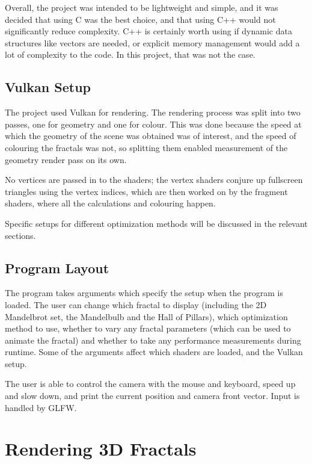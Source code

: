 Overall, the project was intended to be lightweight and simple, and it was decided that using C was the best choice, and that using C++ would not significantly reduce complexity. C++ is certainly worth using if dynamic data structures like vectors are needed, or explicit memory management would add a lot of complexity to the code. In this project, that was not the case.

\subsection{Vulkan Setup}

The project used Vulkan for rendering. The rendering process was split into two passes, one for geometry and one for colour. This was done because the speed at which the geometry of the scene was obtained was of interest, and the speed of colouring the fractals was not, so splitting them enabled measurement of the geometry render pass on its own.\newline

No vertices are passed in to the shaders; the vertex shaders conjure up fullscreen triangles using the vertex indices, which are then worked on by the fragment shaders, where all the calculations and colouring happen.\newline

Specific setups for different optimization methods will be discussed in the relevant sections.

\subsection{Program Layout}

The program takes arguments which specify the setup when the program is loaded. The user can change which fractal to display (including the 2D Mandelbrot set, the Mandelbulb and the Hall of Pillars), which optimization method to use, whether to vary any fractal parameters (which can be used to animate the fractal) and whether to take any performance measurements during runtime. Some of the arguments affect which shaders are loaded, and the Vulkan setup.\newline

The user is able to control the camera with the mouse and keyboard, speed up and slow down, and print the current position and camera front vector. Input is handled by GLFW.

\section{Rendering 3D Fractals}

